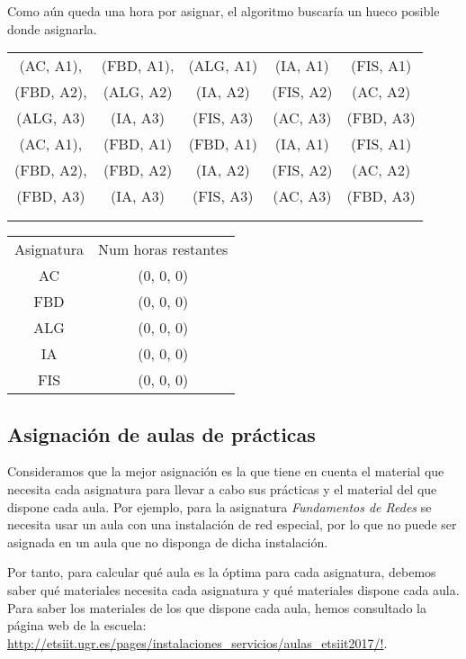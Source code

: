 Como aún queda una hora por asignar, el algoritmo buscaría un hueco posible donde asignarla.

\begin{minipage}{0.8\textwidth}    
\begin{tabular}{| c | c | c | c | c |}
\hline
 (AC, A1), & (FBD, A1), & (ALG, A1) & (IA, A1) & (FIS, A1) \\
 (FBD, A2), & (ALG, A2) & (IA, A2) & (FIS, A2) & (AC, A2) \\
 (ALG, A3) &  (IA, A3) & (FIS, A3) & (AC, A3) & (FBD, A3) \\
 \hline
 (AC, A1), & (FBD, A1) & (FBD, A1) & (IA, A1) & (FIS, A1) \\
 (FBD, A2), & (FBD, A2) & (IA, A2) & (FIS, A2) & (AC, A2) \\
 (FBD, A3) & (IA, A3) & (FIS, A3) & (AC, A3) & (FBD, A3) \\
 \hline
 &  &  &  & \\
 \hline
 &  &  &  & \\
 \hline 
\end{tabular}
\end{minipage}
\begin{minipage}{1\textwidth}
\begin{tabular}{c | c}
Asignatura & Num horas restantes \\
AC & (0, 0, 0) \\
FBD & (0, 0, 0) \\
ALG & (0, 0, 0) \\
IA & (0, 0, 0) \\
FIS & (0, 0, 0)
\end{tabular}
\end{minipage}

\subsection{Asignación de aulas de prácticas}
Consideramos que la mejor asignación es la que tiene en cuenta el material que necesita cada asignatura para llevar a cabo sus prácticas y el material del que dispone cada aula. Por ejemplo, para la asignatura \textit{Fundamentos de Redes} se necesita usar un aula con una instalación de red especial, por lo que no puede ser asignada en un aula que no disponga de dicha instalación. 

Por tanto, para calcular qué aula es la óptima para cada asignatura, debemos saber qué materiales necesita cada asignatura y qué materiales dispone cada aula. Para saber los materiales de los que dispone cada aula, hemos consultado la página web de la escuela: \url{http://etsiit.ugr.es/pages/instalaciones_servicios/aulas_etsiit2017/!}.

